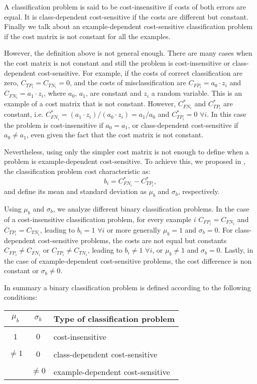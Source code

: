 {  A classification problem is said to be cost-insensitive if costs of both errors are equal. It 
  is class-dependent cost-sensitive if the costs are different but constant. Finally we talk 
  about an example-dependent cost-sensitive classification problem if the cost matrix is not 
  constant for all the examples.

  However, the definition above is not general enough. There are many cases when the cost matrix 
  is not constant and still the problem is cost-insensitive or class-dependent cost-sensitive. 
  For example, if the costs of correct classification are zero, $C_{TP_i}=C_{TN_i}=0$, 
  and the costs of misclassification are $C_{FP_i}=a_0\cdot z_i$ and $C_{FN_i}=a_1\cdot z_i$,
  where $a_0$, $a_1$, are constant and $z_i$ a random variable. This is an example of a cost 
  matrix that is not constant. However, $C^*_{FN_i}$ and $C^*_{TP_i}$ are constant, i.e. 
  $C^*_{FN_i}=(a_1\cdot z_i)/(a_0\cdot z_i)=a_1/a_0$ and $C^*_{TP_i}=0$ $\forall i$. In 
  this case the problem is cost-insensitive if $a_0=a_1$, or class-dependent cost-sensitive if 
  $a_0 \ne a_1$, even given the fact that the cost matrix is not constant.

  Nevertheless, using only the simpler cost matrix is not enough to define when a problem is 
  example-dependent cost-sensitive. To achieve this, we proposed in \citep{CorreaBahnsen2015}, 
  the classification problem cost characteristic as:
  \begin{equation}
    b_i = C^*_{FN_i}-C^*_{TP_i},
  \end{equation}
  and define its mean and standard deviation as $\mu_b$ and $\sigma_b$, respectively.

  Using $\mu_b$ and $\sigma_b$, we analyze different binary classification problems. In the case 
  of a cost-insensitive classification problem, for every example $i$ \mbox{$C_{FP_i}=C_{FN_i}$}
  and $C_{TP_i}=C_{TN_i}$, leading to $b_i=1$ $\forall i$ or more generally $\mu_b=1$ and 
  $\sigma_b=0$. For class-dependent cost-sensitive problems, the costs are not equal but 
  constants \mbox{$C_{FP_i}\ne C_{FN_i}$} or \mbox{$C_{TP_i}\ne C_{TN_i}$}, leading to $b_i \ne 
  1$ $\forall i$, or $\mu_b \ne 1$ and $\sigma_b=0$. Lastly, in the case of example-dependent 
  cost-sensitive problems, the cost difference is non constant or $\sigma_b \ne 0$.

  In summary a binary classification problem is defined according to the following conditions:
  \begin{center}
    \footnotesize
    \begin{tabular}{c | c | l}
      $\mu_b$ & $\sigma_b$ & Type of classification problem \\
      \hline 
      && \\
      $1$ &  $0$ & cost-insensitive \\ &&\\
      $\ne 1$ & $0$ & class-dependent cost-sensitive \\ &&\\
      & $\ne 0$ & example-dependent cost-sensitive \\ 
    \end{tabular}
  \end{center}
  

}
